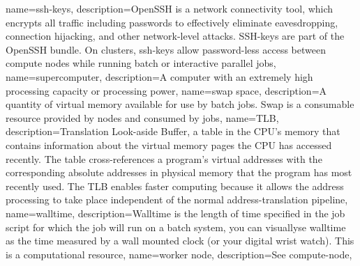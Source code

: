 {
  name={ssh-keys},
  description={OpenSSH is a network connectivity tool, which encrypts all traffic including passwords to effectively eliminate eavesdropping, connection hijacking, and other network-level attacks. SSH-keys are part of the OpenSSH bundle. On \hpc clusters, ssh-keys allow password-less access between compute nodes while running batch or interactive parallel jobs},
}
{
  name={supercomputer},
  description={A computer with an extremely high processing capacity or processing power},
}
{
  name={swap space},
  description={A quantity of virtual memory available for use by batch jobs. Swap is a consumable resource provided by nodes and consumed by jobs},
}
{
  name={TLB},
  description={Translation Look-aside Buffer, a table in the CPU's memory that contains information about the virtual memory pages the CPU has accessed recently. The table cross-references a program's virtual addresses with the corresponding absolute addresses in physical memory that the program has most recently used. The TLB enables faster computing because it allows the address processing to take place independent of the normal address-translation pipeline},
}
{
  name={walltime},
  description={Walltime is the length of time specified in the job script for which the job will run on a batch system, you can visuallyse walltime as the time measured by a wall mounted clock (or your digital wrist watch). This is a computational resource},
}
{
  name={worker node},
  description={See \gls{compute-node}},
}

